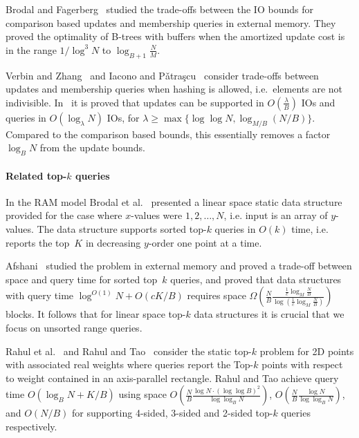 \documentclass[11pt]{article}
\begin{document}
Brodal and Fagerberg~\cite{soda03bf} studied the trade-offs between
the IO bounds for comparison based updates and membership queries in
external memory. They proved the optimality of B-trees with buffers
when the amortized update cost is in the range $1/\log^3 N$ to
$\log_{B+1} \frac{N}{M}$.

Verbin and Zhang~\cite{vz13} and Iacono and
P\v{a}tra\c{s}cu~\cite{soda12ip} consider trade-offs between updates
and membership queries when hashing is allowed, i.e.\ elements are not
indivisible. In~\cite{soda12ip} it is proved that updates can be
supported in $O(\frac{\lambda}{B})$ IOs and queries in
$O(\log_{\lambda} N)$ IOs, for $\lambda\geq\max\{\log\log N,\log_{M/B}
(N/B)\}$. Compared to the comparison based bounds, this essentially
removes a factor $\log_B N$ from the update bounds.

\paragraph*{Related top-$k$ queries}

In the RAM model Brodal et al.~\cite{isaac09bfgl} presented a linear
space static data structure provided for the case where $x$-values
were $1,2,\ldots,N$, i.e. input is an array of $y$-values. The data
structure supports sorted top-$k$ queries in $O(k)$ time, i.e. reports
the top~$K$ in decreasing $y$-order one point at a time.

Afshani~\cite{soda11abz} studied the problem in external memory and
proved a trade-off between space and query time for sorted top~$k$
queries, and proved that data structures with query time
$\log^{O(1)}N+O(cK/B)$ requires space
$\Omega\left(\frac{N}{B}\frac{\frac{1}{c}\log_M \frac{N}{B}}{\log
  (\frac{1}{c}\log_M\frac{N}{B})}\right)$ blocks. It follows that for
linear space top-$k$ data structures it is crucial that we focus on
unsorted range queries.

Rahul et al.~\cite{walcom11rgjr} and Rahul and Tao~\cite{pods15rt}
consider the static top-$k$ problem for 2D points with associated real
weights where queries report the Top-$k$ points with respect to weight
contained in an axis-parallel rectangle. Rahul and Tao\cite{pods15rt}
achieve query time $O(\log_B N+K/B)$ using space
$O(\frac{N}{B}\frac{\log N\cdot(\log\log B)^2}{\log\log_B N})$,
$O(\frac{N}{B}\frac{\log N}{\log\log_B N})$, and $O(N/B)$ for
supporting 4-sided, 3-sided and 2-sided top-$k$ queries respectively.
\end{document}
